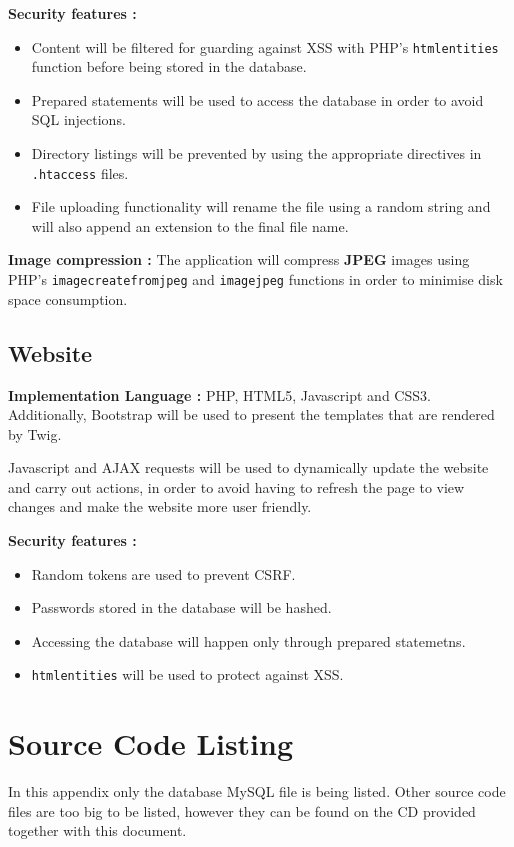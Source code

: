 \documentclass[12pt]{ecsproject}     %
\begin{document}
\textbf{Security features : }
\begin{itemize}
\item Content will be filtered for guarding against XSS with PHP's \texttt{htmlentities} function before being stored in the database.
\item Prepared statements will be used to access the database in order to avoid SQL injections.
\item Directory listings will be prevented by using the appropriate directives in \texttt{.htaccess} files.
\item File uploading functionality will rename the file using a random string and will also append an extension to the final file name.
\end{itemize}

\textbf{Image compression : } The application will compress \textbf{JPEG} images using PHP's \texttt{imagecreatefromjpeg} and \texttt{imagejpeg} functions in order to minimise disk space consumption.

\section{Website}
\textbf{Implementation Language : } PHP, HTML5, Javascript and CSS3. Additionally, Bootstrap will be used to present the templates that are rendered by Twig.

Javascript and AJAX requests will be used to dynamically update the website and carry out actions, in order to avoid having to refresh the page to view changes and make the website more user friendly.

\textbf{Security features : }
\begin{itemize}
\item Random tokens are used to prevent CSRF.
\item Passwords stored in the database will be hashed.
\item Accessing the database will happen only through prepared statemetns.
\item \texttt{htmlentities} will be used to protect against XSS.
\end{itemize}


\chapter{Source Code Listing}
In this appendix only the database MySQL file is being listed. Other source code files are too big to be listed, however they can be found on the CD provided together with this document.
\end{document}
